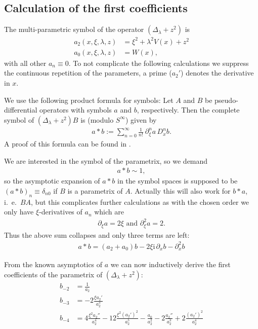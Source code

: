 \subsection{Calculation of the first coefficients}
The multi-parametric symbol of the operator $(\Delta_\lambda + z^2)$ is
\begin{align}
  a_2(x,\xi,\lambda,z) &= \xi^2 + \lambda^2 V(x) + z^2 \\
  a_0(x,\xi,\lambda,z) &= W(x),
  \label{eqn:symbol}
\end{align}
with all other $a_n \equiv 0$. To not complicate the following calculations we
suppress the continuous repetition of the parameters, a prime ($a_2'$) denotes
the derivative in $x$.

We use the following product formula for symbols: Let $A$ and $B$ be
pseudo-differential operators with symbols $a$ and $b$, respectively. Then the
complete symbol of $(\Delta_\lambda + z^2)B$ is (modulo $S^\infty$) given by
\begin{align}
  a * b := \sum_{n=0}^{\infty} \frac{1}{n!}\ \partial_\xi^n a\,D_x^n b.
  \label{eqn:product-formula}
\end{align}
A proof of this formula can be found in \cite[Thm 3.4]{Shu:POS}.

We are interested in the symbol of the parametrix, so we demand
\begin{align*}
  a * b \sim 1,
\end{align*}
so the asymptotic expansion of $a * b$ in the symbol spaces is supposed to be
$(a * b)_n \equiv \delta_{n0}$ if $B$ is a parametrix of $A$. Actually this will
also work for $b * a$, i.~e.\ $BA$, but this complicates further calculations as
with the chosen order we only have $\xi$-derivatives of $a_n$ which are
\begin{align}
  \partial_{\xi} a = 2\xi \text{ and } \partial_{\xi}^2 a = 2.
\end{align}
Thus the above sum collapses and only three terms are left:
\begin{align}
  a * b = (a_2 + a_0)b - 2\xi\mathrm i\,\partial_x b - \partial_x^2 b
\end{align}

From the known asymptotics of $a$ we can now inductively derive the first
coefficients of the parametrix of $(\Delta_\lambda + z^2)$:
\begin{align*}
  b_{-2} &= \frac{1}{a_2} \\
  b_{-3} &= -2\frac{\xi a_2'}{a_2^3}\\
  b_{-4} &= 4\frac{\xi^2 a_2''}{a_2^4}
  - 12\frac{\xi^2 (a_2')^2}{a_2^5} - \frac{a_0}{a_2^2}
  - 2\frac{a_2''}{a_2^3} + 2\frac{(a_2')^2}{a_2^4} \\
  \label{eqn:coeff-symbol}
\end{align*}

